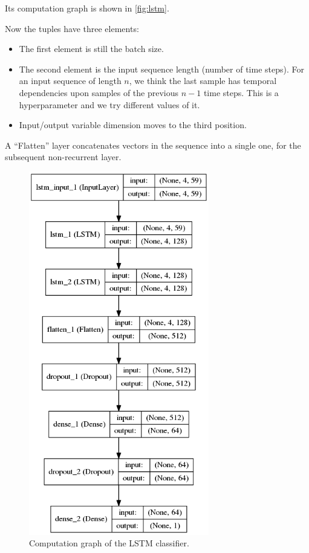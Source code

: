 \documentclass[11pt,a4paper]{report}
\begin{document}
Its computation graph is shown in \autoref{fig:lstm}.

Now the tuples have three elements:

\begin{itemize}
  \item The first element is still the batch size.
  \item The second element is the input sequence length (number of time steps).
    For an input sequence of length \(n\), we think the last sample has temporal dependencies upon samples of the previous \(n-1\) time steps.
    This is a hyperparameter and we try different values of it.
  \item Input/output variable dimension moves to the third position.
\end{itemize}

A \enquote{Flatten} layer concatenates vectors in the sequence into a single one, for the subsequent non-recurrent layer.

\begin{figure}[htbp]
  \centering
  \includegraphics[width=0.7\textwidth]{model-lstm.png}
  \caption{Computation graph of the LSTM classifier.} \label{fig:lstm}
\end{figure}
\end{document}
